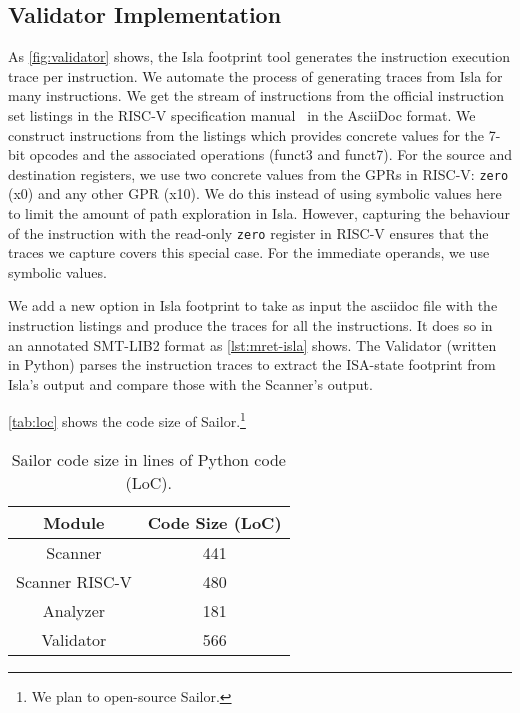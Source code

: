 \subsection{Validator Implementation}

As \autoref{fig:validator} shows, the Isla footprint tool generates the instruction execution trace per instruction. 
We automate the process of generating traces from Isla for many instructions.
We get the stream of instructions from the official instruction set listings in the RISC-V specification manual~\cite{riscv-specs} in the AsciiDoc format. 
We construct instructions from the listings which provides concrete values for the 7-bit opcodes and the associated operations (funct3 and funct7). 
For the source and destination registers, we use two concrete values from the GPRs in RISC-V: \texttt{zero} (x0) and any other GPR (\eg x10). 
We do this instead of using symbolic values here to limit the amount of path exploration in Isla. 
However, capturing the behaviour of the instruction with the read-only \texttt{zero} register in RISC-V ensures that the traces we capture covers this special case. 
For the immediate operands, we use symbolic values. 

We add a new option in Isla footprint to take as input the asciidoc file with the instruction listings and produce the traces for all the instructions. 
It does so in an annotated SMT-LIB2 format as \autoref{lst:mret-isla} shows. 
The Validator (written in Python) parses the instruction traces to extract the ISA-state footprint from Isla's output and compare those with the Scanner's output. 

\autoref{tab:loc} shows the code size of Sailor.\footnote{We plan to open-source Sailor.} 

\begin{table}[t]
\begin{center}
\begin{tabular}{ | c | c | } 
  \hline
  Module & Code Size (LoC)  \\ 
  \hline
  Scanner & 441 \\ 
  \hline
  Scanner RISC-V & 480 \\ 
  \hline 
  Analyzer & 181  \\ 
  \hline 
  Validator & 566 \\
  \hline 
\end{tabular}
\caption{Sailor code size in lines of Python code (LoC).
}
\label{tab:loc}
\end{center}
\end{table}



